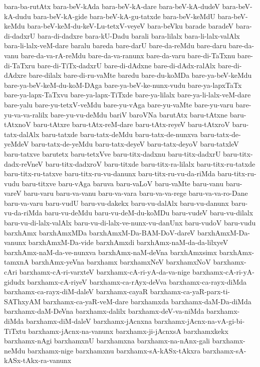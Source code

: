 {bara-ba-rutAtx
bara-beV-kAda
bara-beV-kA-dare
bara-beV-kA-dudeV
bara-beV-kA-dudu
bara-beV-kA-gide
bara-beV-kA-gu-tatxde
bara-beV-keMdU
bara-beV-keMdu
bara-beV-keM-du-keV-Lu-tetxV-veyeV
bara-beVku
barade
baradeV
bara-di-dadxrU
bara-di-dadxre
bara-kU-Dadu
barali
bara-lilalx
bara-li-lalx-valAlx
bara-li-lalx-veM-dare
baralu
bareda
bare-darU
bare-da-reMdu
bare-daru
bare-da-vanu
bare-da-va-rA-reMdu
bare-da-va-ranunx
bare-da-varu
bare-di-TaTxnu
bare-di-TaTxru
bare-di-TiTx-dadxrU
bare-di-dAdxne
bare-di-dAdx-ralAlx
bare-di-dAdxre
bare-dilalx
bare-di-ru-vaMte
baredu
bare-du-koMDa
bare-ya-beV-keMdu
bare-ya-beV-keM-du-koM-DAga
bare-ya-beV-ke-nunx-vudu
bare-ya-lapxTaTx
bare-ya-lapx-TaTxvu
bare-ya-lapx-TiTxde
bare-ya-lilalx
bare-ya-li-lalx-veM-dare
bare-yalu
bare-yu-tetxV-veMdu
bare-yu-vAga
bare-yu-vaMte
bare-yu-varu
bare-yu-va-va-ralilx
bare-yu-vu-deMdu
bariV
baroVNa
barutAtx
baru-tAtxne
baru-tAtxnoV
baru-tAtxre
baru-tAtx-reM-dare
baru-tAtx-reyeV
baru-tAtxroV
baru-tatx-dalAlx
baru-tatxde
baru-tatx-deMdu
baru-tatx-de-nunxva
baru-tatx-de-yeMdeV
baru-tatx-de-yeMdu
baru-tatx-deyeV
baru-tatx-deyoV
baru-tatxleV
baru-tatxve
barutetx
baru-tetxVve
baru-titx-dadxnu
baru-titx-dadxrU
baru-titx-dadx-reVneV
baru-titx-dadxroV
baru-titxde
baru-titx-ra-lilalx
baru-titx-ru-tatxde
baru-titx-ru-tatxve
baru-titx-ru-vu-danunx
baru-titx-ru-vu-da-riMda
baru-titx-ru-vudu
baru-titxve
baru-vAga
baruva
baru-vaLoV
baru-vaMte
baru-vanu
baru-vareV
baru-varu
baru-va-vanu
baru-va-vara
baru-va-va-rege
baru-va-va-ro-Dane
baru-va-varu
baru-vudU
baru-vu-dakekx
baru-vu-dalAlx
baru-vu-danunx
baru-vu-da-riMda
baru-vu-deMdu
baru-vu-deM-du-koMDu
baru-vudeV
baru-vu-dilalx
baru-vu-di-lalx-valAlx
baru-vu-di-lalx-ve-nunx-vu-danUnx
baru-vudoV
baru-vudu
barxhAmx
barxhAmxMDa
barxhAmxM-Da-BAM-DoV-dareV
barxhAmxM-Da-vanunx
barxhAmxM-Da-vide
barxhAmxdi
barxhAmx-naM-da-da-lilxyeV
barxhAmx-naM-da-ve-nunxva
barxhAmx-naM-deVna
barxhAmxsimx
barxhAmx-tamxnA
barxhAmx-yeVna
barxhamx
barxhamxNeV
barxhamxNoV
barxhamx-cAri
barxhamx-cA-ri-varxteV
barxhamx-cA-ri-yA-da-va-nige
barxhamx-cA-ri-yA-gidudx
barxhamx-cA-riyeV
barxhamx-ca-rAyx-deVva
barxhamx-ca-rayx-diMda
barxhamx-ca-rayx-diM-daleV
barxhamx-cayaR
barxhamx-ca-yaR-parx-ti-SAThxyAM
barxhamx-ca-yaR-veM-dare
barxhamxda
barxhamx-daM-Da-diMda
barxhamx-daM-DeVna
barxhamx-dalilx
barxhamx-deV-va-niMda
barxhamx-diMda
barxhamx-diM-daleV
barxhamx-jAcnxna
barxhamx-jAcnx-na-vA-gi-bi-TiTxtu
barxhamx-jAcnx-na-vanunx
barxhamx-ji-jAcnxsA
barxhamxkekx
barxhamx-nAgi
barxhamxnU
barxhamxna
barxhamx-na-nAnx-gali
barxhamx-neMdu
barxhamx-nige
barxhamxnu
barxhamx-sA-kASx-tAkxra
barxhamx-sA-kASx-tAkx-ra-vanunx
}
